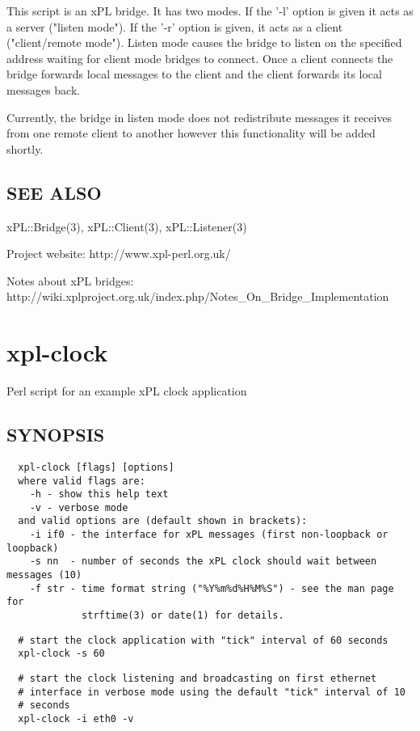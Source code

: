 \documentclass[12pt,a4paper]{article}
\begin{document}
This script is an xPL bridge.  It has two modes.  If the '-l' option
is given it acts as a server ("listen mode").  If the '-r' option is
given, it acts as a client ("client/remote mode").  Listen mode causes
the bridge to listen on the specified address waiting for client mode
bridges to connect.  Once a client connects the bridge forwards local
messages to the client and the client forwards its local messages
back.



Currently, the bridge in listen mode does not redistribute messages it
receives from one remote client to another however this functionality
will be added shortly.

\subsection*{SEE ALSO\label{xpl-bridge_SEE_ALSO}}


xPL::Bridge(3), xPL::Client(3), xPL::Listener(3)



Project website: http://www.xpl-perl.org.uk/



Notes about xPL bridges:
http://wiki.xplproject.org.uk/index.php/Notes\_On\_Bridge\_Implementation

\newpage
\section{xpl-clock\label{xpl-clock}}


Perl script for an example xPL clock application

\subsection*{SYNOPSIS\label{xpl-clock_SYNOPSIS}}
\begin{verbatim}
  xpl-clock [flags] [options]
  where valid flags are:
    -h - show this help text
    -v - verbose mode
  and valid options are (default shown in brackets):
    -i if0 - the interface for xPL messages (first non-loopback or loopback)
    -s nn  - number of seconds the xPL clock should wait between messages (10)
    -f str - time format string ("%Y%m%d%H%M%S") - see the man page for
             strftime(3) or date(1) for details.
\end{verbatim}
\begin{verbatim}
  # start the clock application with "tick" interval of 60 seconds
  xpl-clock -s 60
\end{verbatim}
\begin{verbatim}
  # start the clock listening and broadcasting on first ethernet
  # interface in verbose mode using the default "tick" interval of 10
  # seconds
  xpl-clock -i eth0 -v
\end{verbatim}
\end{document}
